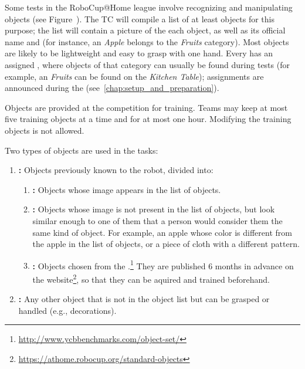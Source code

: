 Some tests in the RoboCup@Home league involve recognizing and manipulating objects (see Figure~).
The TC will compile a list of at least \NumObjects objects for this purpose; the list will contain a picture of the each object, as well as its official name and \ObjectCategory{} (for instance, an \textit{Apple} belongs to the \textit{Fruits} category).
Most objects are likely to be lightweight and easy to grasp with one hand.
Every \ObjectCategory{} has an assigned \PredefinedLocation, where objects of that category can usually be found during tests (for example, an \textit{Fruits} can be found on the \textit{Kitchen Table}); assignments are announced during the \SetupDays{} (see~\ref{chap:setup_and_preparation}).

Objects are provided at the competition for training.
Teams may keep at most five training objects at a time and for at most one hour.
Modifying the training objects is not allowed.

Two types of objects are used in the tasks:
\begin{enumerate}
	\item \textbf{\KnownObjects{}:} Objects previously known to the robot, divided into:
	\begin{enumerate}
		\item \textbf{\ConsistentObjects{}:} Objects whose image appears in the list of objects.
		\item \textbf{\SimilarObjects{}:} Objects whose image is not present in the list of objects, but look similar enough to one of them that a person would consider them the same kind of object. For example, an apple whose color is different from the apple in the list of objects, or a piece of cloth with a different pattern.
		\item \textbf{\StandardObjects{}:} Objects chosen from the \YCBData{}.\footnote{\url{http://www.ycbbenchmarks.com/object-set/}} They are published 6 months in advance on the \RoboCup\AtHome{} website\footnote{\url{https://athome.robocup.org/standard-objects}}, so that they can be aquired and trained beforehand.
	\end{enumerate}
	\item \textbf{\UnknownObjects{}:} Any other object that is not in the object list but can be grasped or handled (e.g., \Arena{} decorations).
\end{enumerate}

